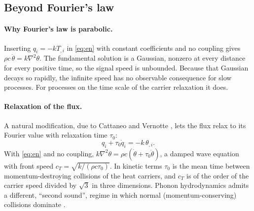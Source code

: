 \begin{table}[ht]\centering\small
\caption{Thermoelastic coupling $\varepsilon$ and characteristic frequency $f_*=\omega_*/2\pi$ computed from rounded handbook-type values (300\,K) of density, specific heat, conductivity, expansion coefficient, Young's modulus and Poisson ratio; the reader should replace them by data for the specimen at hand.}\label{tab:materials}

\end{table}

\subsection{Beyond Fourier's law}\label{sec:beyond}
\paragraph{Why Fourier's law is parabolic.} Inserting $q_i=-kT_{,i}$ in \eqref{eq:en} with constant coefficients and no coupling gives $\rho c\,\dot\theta=k\nabla^2\theta$. The fundamental solution is a Gaussian, nonzero at every distance for every positive time, so the signal speed is unbounded. Because that Gaussian decays so rapidly, the infinite speed has no observable consequence for slow processes. For processes on the time scale of the carrier relaxation it does.

\paragraph{Relaxation of the flux.} A natural modification, due to Cattaneo and Vernotte \citep{Cattaneo1948,Vernotte1958}, lets the flux relax to its Fourier value with relaxation time $\tau_0$:
\begin{equation}
q_i+\tau_0\dot q_i=-k\,\theta_{,i}.\label{eq:cattaneo}
\end{equation}
With \eqref{eq:en} and no coupling, $k\nabla^2\theta=\rho c(\dot\theta+\tau_0\ddot\theta)$, a damped wave equation with front speed $c_T=\sqrt{k/(\rho c\tau_0)}$. In kinetic terms $\tau_0$ is the mean time between momentum-destroying collisions of the heat carriers, and $c_T$ is of the order of the carrier speed divided by $\sqrt3$ in three dimensions. Phonon hydrodynamics admits a different, ``second sound'', regime in which normal (momentum-conserving) collisions dominate \citep{GuyerKrumhansl1966,GuyerKrumhansl1966II,Chester1963}.

